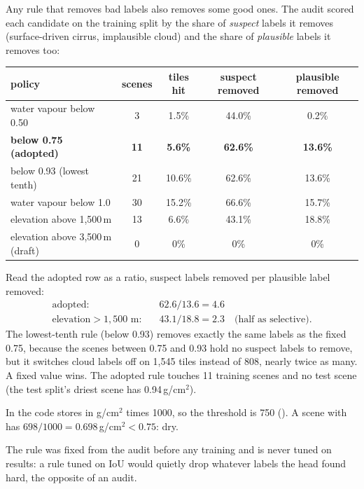 Any rule that removes bad labels also removes some good ones. The audit scored each candidate on the training split by the share of
\emph{suspect} labels it removes (surface-driven cirrus, implausible cloud) and the share of \emph{plausible} labels it removes too:
\begin{center}\small
\begin{tabular}{lcccc}
\toprule
policy & scenes & tiles hit & suspect removed & plausible removed\\
\midrule
water vapour below 0.50 & 3 & 1.5\% & 44.0\% & 0.2\%\\
\textbf{below 0.75 (adopted)} & \textbf{11} & \textbf{5.6\%} & \textbf{62.6\%} & \textbf{13.6\%}\\
below 0.93 (lowest tenth) & 21 & 10.6\% & 62.6\% & 13.6\%\\
water vapour below 1.0 & 30 & 15.2\% & 66.6\% & 15.7\%\\
elevation above 1,500\,m & 13 & 6.6\% & 43.1\% & 18.8\%\\
elevation above 3,500\,m (draft) & 0 & 0\% & 0\% & 0\%\\
\bottomrule
\end{tabular}
\end{center}
Read the adopted row as a ratio, suspect labels removed per plausible label removed:
\begin{align*}
  \text{adopted:}&\quad 62.6 / 13.6 = 4.6\\
  \text{elevation} > 1{,}500\text{ m:}&\quad 43.1 / 18.8 = 2.3 \quad\text{(half as selective).}
\end{align*}
The lowest-tenth rule (below 0.93) removes exactly the same labels as the fixed 0.75, because the scenes between 0.75 and 0.93 hold no suspect
labels to remove, but it switches cloud labels off on 1,545 tiles instead of 808, nearly twice as many. A fixed value wins. The adopted rule touches
11 training scenes and no test scene (the test split's driest scene has 0.94\,g/cm$^2$).

In the code  stores  in g/cm$^2$ times 1000, so the threshold is 750 (). A scene with
 has $698/1000 = 0.698$\,g/cm$^2 < 0.75$: dry.

\begin{keypoint}
The rule was fixed from the audit before any training and is never tuned on results: a rule tuned on IoU would quietly drop whatever labels the head
found hard, the opposite of an audit.
\end{keypoint}

